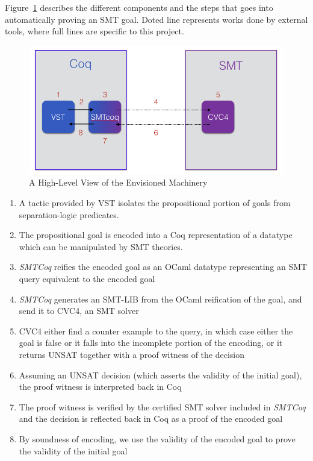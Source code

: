 \documentclass[onecolumn, preprint]{sigplanconf}
\begin{document}
Figure~\ref{fig:highlvl} describes the different components and the steps that goes into automatically proving an SMT goal. Doted line represents works done by external tools, where full lines are specific to this project.

\begin{figure}[ht]
\begin{center}
\includegraphics[scale=0.5]{pictures/arch.png}
\end{center}
\caption{A High-Level View of the Envisioned Machinery}
\label{fig:highlvl}
\end{figure}

\begin{enumerate}
\item %
  A tactic provided by VST isolates the propositional portion of goals from separation-logic predicates.
\item %
  The propositional goal is encoded into a Coq representation of a datatype which can be manipulated by SMT theories.
  
\item %
 \emph{SMTCoq} reifies the encoded goal as an OCaml datatype representing an SMT query equivalent to the encoded goal
  
\item %
  \emph{SMTCoq} generates an SMT-LIB \citep{smtlib} from the OCaml reification of the goal, and send it to CVC4, an SMT solver
  
\item %
  CVC4 either find a counter example to the query, in which case either the goal is false or it falls into the incomplete portion of the encoding, or it returns UNSAT together with a proof witness of the decision
  
\item %
  Assuming an UNSAT decision (which asserts the validity of the initial goal), the proof witness is interpreted back in Coq 
  
  
\item %
  The proof witness is verified by the certified SMT solver included in \emph{SMTCoq} and the decision is reflected back in Coq as a proof of the encoded goal
  
\item %
  By soundness of encoding, we use the validity of the encoded goal to prove the validity of the initial goal

  
\end{enumerate}
\end{document}
